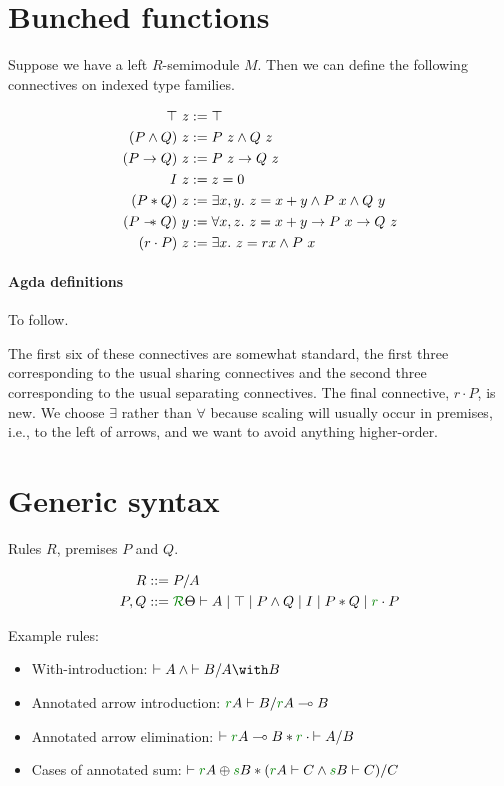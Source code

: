 \SimplePremises

\section{Bunched functions}

Suppose we have a left $R$-semimodule $M$.
Then we can define the following connectives on indexed type families.

\begin{align*}
  \top~z &:= \top \\
  (P \wedge Q)~z &:= P~z \wedge Q~z \\
  (P \to Q)~z &:= P~z \to Q~z \\
  I~z &:= z = 0 \\
  (P * Q)~z &:= \exists x,y.~z = x+y \wedge P~x \wedge Q~y \\
  (P \mathrel{\mathord{-}\hspace{-0.75ex}*} Q)~y &:= \forall x,z.~z = x+y \to P~x \to Q~z \\
  (r \cdot P)~z &:= \exists x.~z = rx \wedge P~x
\end{align*}

\paragraph{Agda definitions}
To follow.

The first six of these connectives are somewhat standard, the first three
corresponding to the usual sharing connectives and the second three
corresponding to the usual separating connectives.
The final connective, $r \cdot P$, is new.
We choose $\exists$ rather than $\forall$ because scaling will usually occur in
premises, i.e., to the left of arrows, and we want to avoid anything
higher-order.

\section{Generic syntax}

Rules $R$, premises $P$ and $Q$.

\begin{align*}
  R &::= P/A \\
  P,Q &::= \grR\Theta \vdash A \mid \top \mid P \wedge Q \mid I \mid P * Q
        \mid \gr r \cdot P
\end{align*}

Example rules:

\begin{itemize}
  \item With-introduction: ${\vdash A} \wedge {\vdash B} / A \with B$
  \item Annotated arrow introduction:
    ${\gr rA \vdash B} / \gr rA \multimap B$
  \item Annotated arrow elimination:
    ${\vdash \gr rA \multimap B} * \gr r \cdot {\vdash A} / B$
  \item Cases of annotated sum:
    ${\vdash \gr rA \oplus \gr sB}
    * ({\gr rA \vdash C} \wedge {\gr sB \vdash C}) / C$
\end{itemize}

